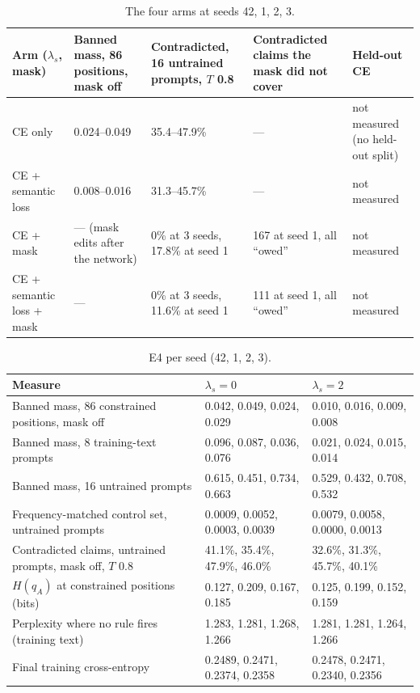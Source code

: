 \documentclass[letterpaper, 10pt, conference]{IEEEtran}
\begin{document}
\begin{table}[t]
\caption{The four arms at seeds 42, 1, 2, 3.}\label{tab:arms}
\centering\footnotesize\setlength{\tabcolsep}{5pt}
\begin{tabular}{@{}L{3.0cm}L{3.2cm}L{3.4cm}L{3.4cm}L{3.0cm}@{}}
\toprule
Arm ($\lambda_s$, mask) & Banned mass, 86 positions, mask off & Contradicted, 16 untrained prompts, $T$ 0.8 & Contradicted claims the mask did not cover & Held-out CE\\
\midrule
CE only & 0.024--0.049 & 35.4--47.9\% & --- & not measured (no held-out split)\\
CE + semantic loss & 0.008--0.016 & 31.3--45.7\% & --- & not measured\\
CE + mask & --- (mask edits after the network) & 0\% at 3 seeds, 17.8\% at seed 1 & 167 at seed 1, all ``owed'' & not measured\\
CE + semantic loss + mask & --- & 0\% at 3 seeds, 11.6\% at seed 1 & 111 at seed 1, all ``owed'' & not measured\\
\bottomrule
\end{tabular}
\end{table}

\begin{table}[t]
\caption{E4 per seed (42, 1, 2, 3).}\label{tab:e4}
\centering\footnotesize\setlength{\tabcolsep}{5pt}
\begin{tabular}{@{}lll@{}}
\toprule
Measure & $\lambda_s{=}0$ & $\lambda_s{=}2$\\
\midrule
Banned mass, 86 constrained positions, mask off & 0.042, 0.049, 0.024, 0.029 & 0.010, 0.016, 0.009, 0.008\\
Banned mass, 8 training-text prompts & 0.096, 0.087, 0.036, 0.076 & 0.021, 0.024, 0.015, 0.014\\
Banned mass, 16 untrained prompts & 0.615, 0.451, 0.734, 0.663 & 0.529, 0.432, 0.708, 0.532\\
Frequency-matched control set, untrained prompts & 0.0009, 0.0052, 0.0003, 0.0039 & 0.0079, 0.0058, 0.0000, 0.0013\\
Contradicted claims, untrained prompts, mask off, $T$ 0.8 & 41.1\%, 35.4\%, 47.9\%, 46.0\% & 32.6\%, 31.3\%, 45.7\%, 40.1\%\\
$H(q_A)$ at constrained positions (bits) & 0.127, 0.209, 0.167, 0.185 & 0.125, 0.199, 0.152, 0.159\\
Perplexity where no rule fires (training text) & 1.283, 1.281, 1.268, 1.266 & 1.281, 1.281, 1.264, 1.266\\
Final training cross-entropy & 0.2489, 0.2471, 0.2374, 0.2358 & 0.2478, 0.2471, 0.2340, 0.2356\\
\bottomrule
\end{tabular}
\end{table}
\end{document}
